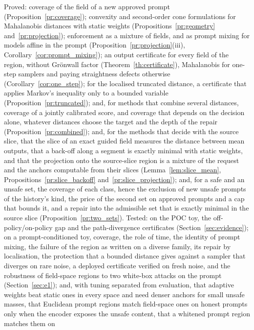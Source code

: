 \documentclass{article}
\theoremstyle{plain}
\theoremstyle{remark}
\begin{document}
Proved: coverage of the field of a new approved prompt (Proposition~\ref{pr:coverage}); convexity and
second-order cone formulations for Mahalanobis distances with static weights (Propositions~\ref{pr:geometry} and~\ref{pr:projection});
enforcement as a mixture of fields, and as prompt mixing for models affine in the prompt
(Proposition~\ref{pr:projection}(iii), Corollary~\ref{cor:prompt_mixing}); an output certificate for every field of the region,
without Gr\"onwall factor (Theorem~\ref{th:certificate}), Mahalanobis for one-step samplers and paying straightness
defects otherwise (Corollary~\ref{cor:one_step}); for the localised truncated distance, a certificate that applies Markov's
inequality only to a bounded variable (Proposition~\ref{pr:truncated}); and, for methods that combine several distances, coverage
of a jointly calibrated score, and coverage that depends on the decision alone, whatever distances choose the target and the depth
of the repair (Proposition~\ref{pr:combined}); and, for the methods that decide with the source slice, that the slice of an exact guided
field measures the distance between mean outputs, that a back-off along a segment is exactly minimal with static weights, and that
the projection onto the source-slice region is a mixture of the request and the anchors computable from their slices
(Lemma~\ref{lem:slice_mean}, Propositions~\ref{pr:slice_backoff} and~\ref{pr:slice_projection}); and, for a safe and an unsafe set, the
coverage of each class, hence the exclusion of new unsafe prompts of the history's kind, the price of the second set on approved prompts
and a cap that bounds it, and a repair into the admissible set that is exactly minimal in the source slice
(Proposition~\ref{pr:two_sets}). Tested: on the POC toy, the off-policy/on-policy gap and the
path-divergence certificates (Section~\ref{sec:evidence}); on a prompt-conditioned toy, coverage, the role of time, the identity of
prompt mixing, the failure of the region as written on a diverse family, its repair by localisation, the protection that a bounded
distance gives against a sampler that diverges on rare noise, a deployed certificate verified on fresh noise, and the robustness of
field-space regions to two white-box attacks on the prompt (Section~\ref{sec:e1}); and, with tuning separated from evaluation, that
adaptive weights beat static ones in every space and need denser anchors for small unsafe masses, that Euclidean prompt regions match
field-space ones on honest prompts only when the encoder exposes the unsafe content, that a whitened prompt region matches them on
\end{document}

